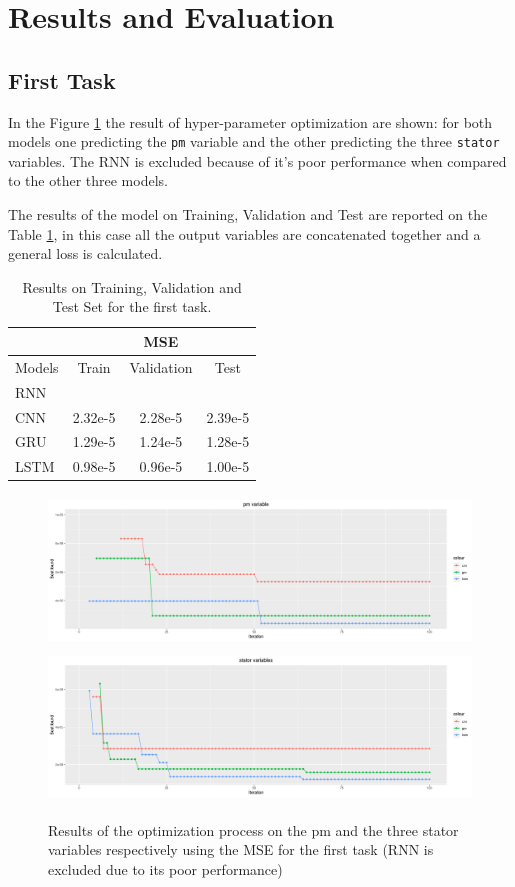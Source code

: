 \section{Results and Evaluation}
 
\subsection{First Task}
In the Figure \ref{fig:automl_mse} the result of hyper-parameter optimization are shown: for both models one predicting the \verb|pm| variable and the other predicting the three \verb|stator| variables. The RNN is excluded because of it's poor performance when compared to the other three models.

The results of the model on Training, Validation and Test are reported on the Table \ref{tab:first}, in this case all the output variables are concatenated together and a general loss is calculated.
\begin{table}[!h]
  \centering
  \begin{tabular}{|l|c|c|c|}
    \hline
    & \multicolumn{3}{|c|}{MSE} \\
    \hline
    Models & Train & Validation & Test \\
    \hline
    RNN & & & \\
    CNN & 2.32e-5 & 2.28e-5  & 2.39e-5 \\
    GRU & 1.29e-5 & 1.24e-5 & 1.28e-5 \\
    LSTM & 0.98e-5 & 0.96e-5 & 1.00e-5 \\
    \hline
  \end{tabular}
  \caption{Results on Training, Validation and Test Set for the first task.}
  \label{tab:first}
\end{table}
\begin{figure}[!h]
    \centering
    \includegraphics[width=\linewidth, height=4cm]{imgs/comparison_MSE.png}
    \includegraphics[width=\linewidth, height=4cm]{imgs/comparison_MSE_stator.png}
    \caption{Results of the optimization process on the pm and the three stator variables respectively using the MSE for the first task (RNN is excluded due to its poor performance)}
    \label{fig:automl_mse}
\end{figure}
  

